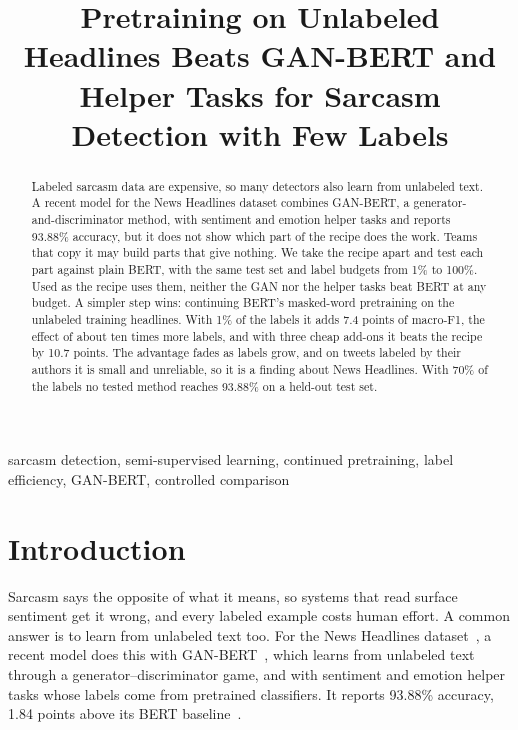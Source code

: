 \documentclass[conference]{IEEEtran}
\begin{document}
\title{Pretraining on Unlabeled Headlines Beats GAN-BERT and Helper Tasks for Sarcasm Detection with Few Labels}

\author{
}

\maketitle

\begin{abstract}
Labeled sarcasm data are expensive, so many detectors also learn from unlabeled text. A recent model for the News Headlines dataset combines GAN-BERT, a generator-and-discriminator method, with sentiment and emotion helper tasks and reports 93.88\% accuracy, but it does not show which part of the recipe does the work. Teams that copy it may build parts that give nothing. We take the recipe apart and test each part against plain BERT, with the same test set and label budgets from 1\% to 100\%. Used as the recipe uses them, neither the GAN nor the helper tasks beat BERT at any budget. A simpler step wins: continuing BERT's masked-word pretraining on the unlabeled training headlines. With 1\% of the labels it adds 7.4 points of macro-F1, the effect of about ten times more labels, and with three cheap add-ons it beats the recipe by 10.7 points. The advantage fades as labels grow, and on tweets labeled by their authors it is small and unreliable, so it is a finding about News Headlines. With 70\% of the labels no tested method reaches 93.88\% on a held-out test set.
\end{abstract}

\begin{IEEEkeywords}
sarcasm detection, semi-supervised learning, continued pretraining, label efficiency, GAN-BERT, controlled comparison
\end{IEEEkeywords}

\section{Introduction}

Sarcasm says the opposite of what it means, so systems that read surface sentiment get it wrong, and every labeled example costs human effort. A common answer is to learn from unlabeled text too. For the News Headlines dataset~\cite{misra2023sarcasm}, a recent model does this with GAN-BERT~\cite{croce2020ganbert}, which learns from unlabeled text through a generator--discriminator game, and with sentiment and emotion helper tasks whose labels come from pretrained classifiers. It reports 93.88\% accuracy, 1.84 points above its BERT baseline~\cite{irfan2025seed}.
\end{document}
